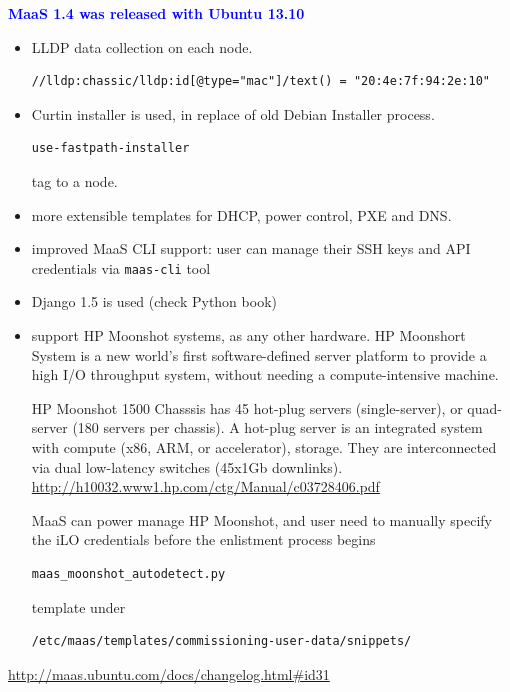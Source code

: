 \textcolor{blue}{\bf MaaS 1.4 was released with Ubuntu 13.10}
\begin{itemize}
  \item LLDP data collection on each node.
\begin{verbatim}
//lldp:chassic/lldp:id[@type="mac"]/text() = "20:4e:7f:94:2e:10"
\end{verbatim}

  \item Curtin installer is used, in replace of old Debian Installer process.
\begin{verbatim}
use-fastpath-installer
\end{verbatim}
tag to a node.

  \item more extensible templates for DHCP, power control, PXE and DNS.
  
  \item improved MaaS CLI support: user can manage their SSH keys and API
  credentials via \verb!maas-cli! tool
  
  \item Django 1.5 is used (check Python book)
  
  \item support HP Moonshot systems, as any other hardware. HP Moonshort System
  is a new world's first software-defined server platform to provide a high
  I/O throughput system, without needing a compute-intensive machine.
  
  HP Moonshot 1500 Chasssis has 45 hot-plug servers (single-server), or
  quad-server (180 servers per chassis). A hot-plug server is an integrated
  system with compute (x86, ARM, or accelerator), storage. They are
  interconnected via dual low-latency switches (45x1Gb downlinks).
  \url{http://h10032.www1.hp.com/ctg/Manual/c03728406.pdf} 
  
  MaaS can power manage HP Moonshot, and user need to manually specify the iLO
  credentials before the enlistment process begins
\begin{verbatim}
maas_moonshot_autodetect.py
\end{verbatim}
template under 
\begin{verbatim}
/etc/maas/templates/commissioning-user-data/snippets/
\end{verbatim}
\end{itemize}
\url{http://maas.ubuntu.com/docs/changelog.html\#id31}

